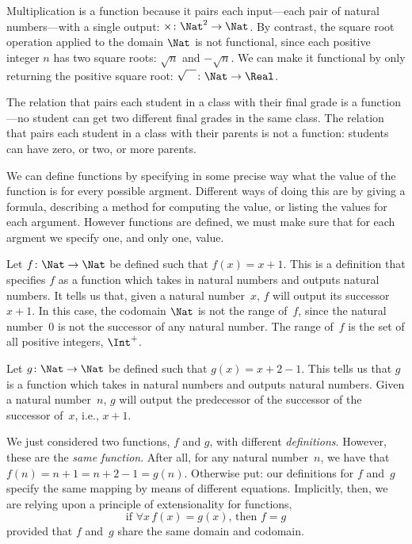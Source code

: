 \documentclass[../../../include/open-logic-section]{subfiles}
\begin{document}
\begin{ex}
Multiplication is a function because it pairs each input---each pair
of natural numbers---with a single output: $\times \colon \Nat^2 \to
\Nat$. By contrast, the square root operation applied to the domain
$\Nat$ is not functional, since each positive integer $n$ has two
square roots: $\sqrt{n}$ and $-\sqrt{n}$. We can make it functional by
only returning the positive square root: $\sqrt{\phantom{X}} \colon
\Nat \to \Real$. 
\end{ex}

\begin{ex}
The relation that pairs each student in a class with their final grade
is a function---no student can get two different final grades in the
same class. The relation that pairs each student in a class with their
parents is not a function: students can have zero, or two, or more
parents.
\end{ex}

\begin{explain}
We can define functions by specifying in some precise way what the
value of the function is for every possible argment. Different ways of
doing this are by giving a formula, describing a method for computing
the value, or listing the values for each argument. However functions
are defined, we must make sure that for each argment we specify one,
and only one, value.
\end{explain}


\begin{ex}
Let $f \colon \Nat \to \Nat$ be defined such that $f(x) = x+1$. This
is a definition that specifies $f$ as a function which takes in
natural numbers and outputs natural numbers. It tells us that, given a
natural number~$x$, $f$ will output its successor~$x+1$.
In this case, the codomain $\Nat$ is not the range of~$f$, since the
natural number~$0$ is not the successor of any natural number. The
range of~$f$ is the set of all positive integers, $\Int^{+}$.
\end{ex}

\begin{ex}
Let $g \colon \Nat \to \Nat$ be defined such that $g(x) = x+2-1$. This
tells us that $g$ is a function which takes in natural numbers and
outputs natural numbers. Given a natural number~$n$, $g$ will output
the predecessor of the successor of the successor of~$x$, i.e.,
$x+1$.
\end{ex}

\begin{explain}
We just considered two functions, $f$ and $g$, with different
\emph{definitions}. However, these are the \emph{same function}. After
all, for any natural number~$n$, we have that $f(n) = n+1 = n+2-1 =
g(n)$. Otherwise put: our  definitions for $f$ and~$g$ specify the
same mapping by means of different equations. Implicitly, then, we are
relying upon a principle of extensionality for functions, 
\[
  \text{if }\forall x\, f(x) = g(x)\text{, then }f = g
\]
provided that $f$ and~$g$ share the same domain and codomain.
\end{explain}
\end{document}

